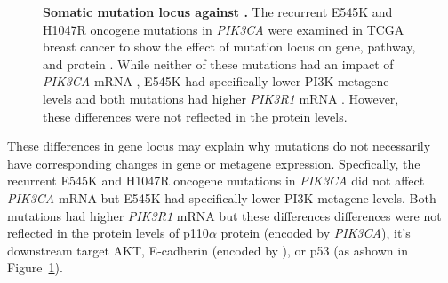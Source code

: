\begin{figure}[!ht]
\begin{center}
    \end{center}
    \caption[Somatic \gls{mutation} locus against ]{\small \textbf{Somatic \gls{mutation} locus against .} The recurrent E545K and H1047R \gls{oncogene} \glspl{mutation} in \textit{PIK3CA} were examined in \gls{TCGA} breast cancer to show the effect of \gls{mutation} locus on gene, pathway, and protein . While neither of these \glspl{mutation} had an impact of \textit{PIK3CA} \acrshort{mRNA} , E545K had specifically lower PI3K \citep{Gatza2011} \gls{metagene} levels and both \glspl{mutation} had higher \textit{PIK3R1} \acrshort{mRNA} . However, these differences were not reflected in the protein  levels.
}
\label{fig:mutation_expr}
\end{figure}

These differences in gene locus may explain why \glspl{mutation} do not necessarily have corresponding changes in gene or meta\gls{gene expression}. Specfically, the recurrent E545K and H1047R \gls{oncogene} \glspl{mutation} in \textit{PIK3CA} did not affect \textit{PIK3CA} \acrshort{mRNA}  but E545K had specifically lower PI3K \citep{Gatza2011} \gls{metagene} levels. Both \glspl{mutation} had higher \textit{PIK3R1} \acrshort{mRNA}  but these differences differences were not reflected in the protein  levels of p110$\alpha$ protein (encoded by \textit{PIK3CA}), it's downstream target AKT, \gls{E-cadherin} (encoded by ), or p53 (as ashown in Figure~\ref{fig:mutation_expr}).

